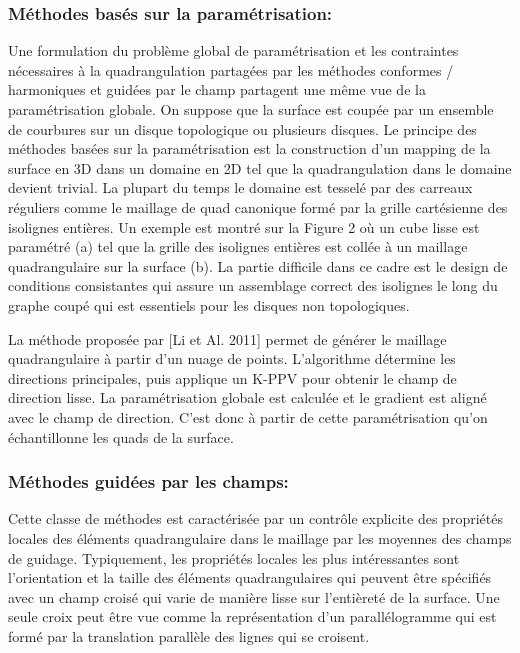 \documentclass[runningheads]{llncs}
\begin{document}
\subsubsection{Méthodes basés sur la paramétrisation:}Une formulation du problème global de paramétrisation et les contraintes nécessaires à la quadrangulation partagées par les méthodes conformes / harmoniques et guidées par le champ partagent une même vue de la paramétrisation globale.
On suppose que la surface est coupée par un ensemble de courbures sur un disque topologique ou plusieurs disques. Le principe des méthodes basées sur la paramétrisation est la construction d’un mapping de la surface en 3D dans un domaine en 2D tel que la quadrangulation dans le domaine devient trivial. La plupart du temps le domaine est tesselé par des carreaux réguliers comme le maillage de quad canonique formé par la grille cartésienne des isolignes entières.
Un exemple est montré sur la Figure 2 où un cube lisse est paramétré (a) tel que la grille des isolignes entières est collée à un maillage quadrangulaire sur la surface (b). La partie difficile dans ce cadre est le design de conditions consistantes qui assure un assemblage correct des isolignes le long du graphe coupé qui est essentiels pour les disques non topologiques.

La méthode proposée par [Li et Al. 2011]\cite{li_meshless_2011} permet de générer le maillage quadrangulaire à partir d’un nuage de points. L’algorithme détermine les directions principales, puis applique un K-PPV pour obtenir le champ de direction lisse. La paramétrisation globale est calculée et le gradient est aligné avec le champ de direction. C’est donc à partir de cette paramétrisation qu’on échantillonne les quads de la surface.


\subsubsection{Méthodes guidées par les champs:}
Cette classe de méthodes est caractérisée par un contrôle explicite des propriétés locales des éléments quadrangulaire dans le maillage par les moyennes des champs de guidage. Typiquement, les propriétés locales les plus intéressantes sont l’orientation et la taille des éléments quadrangulaires qui peuvent être spécifiés avec un champ croisé qui varie de manière lisse sur l'entièreté de la surface. Une seule croix peut être vue comme la représentation d’un parallélogramme qui est formé par la translation parallèle des lignes qui se croisent.
\end{document}
